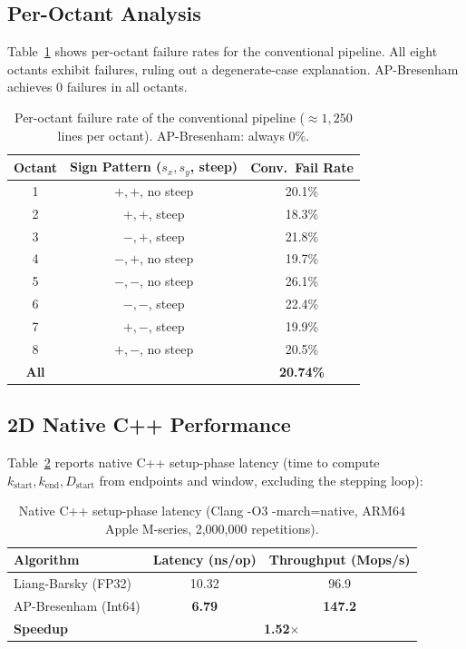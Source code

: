 \documentclass[12pt,a4paper]{article}
\theoremstyle{definition}
\newcommand{\kst}{k_{\mathrm{start}}}
\newcommand{\ken}{k_{\mathrm{end}}}
\begin{document}
\subsection{Per-Octant Analysis}

Table~\ref{tab:octant} shows per-octant failure rates for
the conventional pipeline. All eight octants exhibit
failures, ruling out a degenerate-case explanation.
AP-Bresenham achieves 0 failures in all octants.

\begin{table}[tb]
\centering
\caption{Per-octant failure rate of the conventional
pipeline ($\approx 1{,}250$ lines per octant).
AP-Bresenham: always 0\%.}
\label{tab:octant}
\begin{tabular}{ccc}
\toprule
\textbf{Octant} & \textbf{Sign Pattern ($s_x,s_y$, steep)}
  & \textbf{Conv.\ Fail Rate} \\
\midrule
1  & $+,+$, no steep  & 20.1\% \\
2  & $+,+$, steep     & 18.3\% \\
3  & $-,+$, steep     & 21.8\% \\
4  & $-,+$, no steep  & 19.7\% \\
5  & $-,-$, no steep  & 26.1\% \\
6  & $-,-$, steep     & 22.4\% \\
7  & $+,-$, steep     & 19.9\% \\
8  & $+,-$, no steep  & 20.5\% \\
\midrule
\textbf{All} & & \textbf{20.74\%} \\
\bottomrule
\end{tabular}
\end{table}

\subsection{2D Native C++ Performance}

Table~\ref{tab:perf_2d} reports native C++ setup-phase
latency (time to compute $\kst, \ken, D_{\mathrm{start}}$
from endpoints and window, excluding the stepping loop):

\begin{table}[tb]
\centering
\caption{Native C++ setup-phase latency
(Clang -O3 -march=native, ARM64 Apple M-series,
2,000,000 repetitions).}
\label{tab:perf_2d}
\begin{tabular}{lcc}
\toprule
\textbf{Algorithm} & \textbf{Latency (ns/op)}
  & \textbf{Throughput (Mops/s)} \\
\midrule
Liang-Barsky (FP32)   & 10.32 & 96.9 \\
AP-Bresenham (Int64)  & \textbf{6.79}  & \textbf{147.2} \\
\midrule
\textbf{Speedup}      & \multicolumn{2}{c}{\textbf{1.52$\times$}} \\
\bottomrule
\end{tabular}
\end{table}
\end{document}
